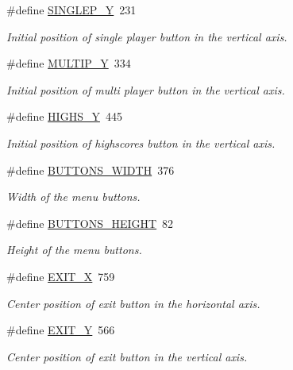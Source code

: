 \begin{DoxyCompactItemize}
\#define \hyperlink{group___b_m_ps_holder_ga19da38bd34116364d23ed824fbede542}{S\+I\+N\+G\+L\+E\+P\+\_\+Y}~231
\begin{DoxyCompactList}\small\item\em Initial position of single player button in the vertical axis. \end{DoxyCompactList}\item 
\#define \hyperlink{group___b_m_ps_holder_ga1d957cbc192cbdb76c80729a7a4e8781}{M\+U\+L\+T\+I\+P\+\_\+Y}~334
\begin{DoxyCompactList}\small\item\em Initial position of multi player button in the vertical axis. \end{DoxyCompactList}\item 
\#define \hyperlink{group___b_m_ps_holder_gac1e57f1ff5614ef7f370bcc296db9bb7}{H\+I\+G\+H\+S\+\_\+Y}~445
\begin{DoxyCompactList}\small\item\em Initial position of highscores button in the vertical axis. \end{DoxyCompactList}\item 
\#define \hyperlink{group___b_m_ps_holder_gabdf8cdcc51fec3510df544a673532eaa}{B\+U\+T\+T\+O\+N\+S\+\_\+\+W\+I\+D\+TH}~376
\begin{DoxyCompactList}\small\item\em Width of the menu buttons. \end{DoxyCompactList}\item 
\#define \hyperlink{group___b_m_ps_holder_ga9721e4c146c7397fb06134ef6716d19b}{B\+U\+T\+T\+O\+N\+S\+\_\+\+H\+E\+I\+G\+HT}~82
\begin{DoxyCompactList}\small\item\em Height of the menu buttons. \end{DoxyCompactList}\item 
\#define \hyperlink{group___b_m_ps_holder_gaefbb305e5b4d7c7402d158fff6f1c163}{E\+X\+I\+T\+\_\+X}~759
\begin{DoxyCompactList}\small\item\em Center position of exit button in the horizontal axis. \end{DoxyCompactList}\item 
\#define \hyperlink{group___b_m_ps_holder_ga46bb001d1c62f7725f3258824caeb260}{E\+X\+I\+T\+\_\+Y}~566
\begin{DoxyCompactList}\small\item\em Center position of exit button in the vertical axis. \end{DoxyCompactList}\item 

\end{DoxyCompactItemize}
